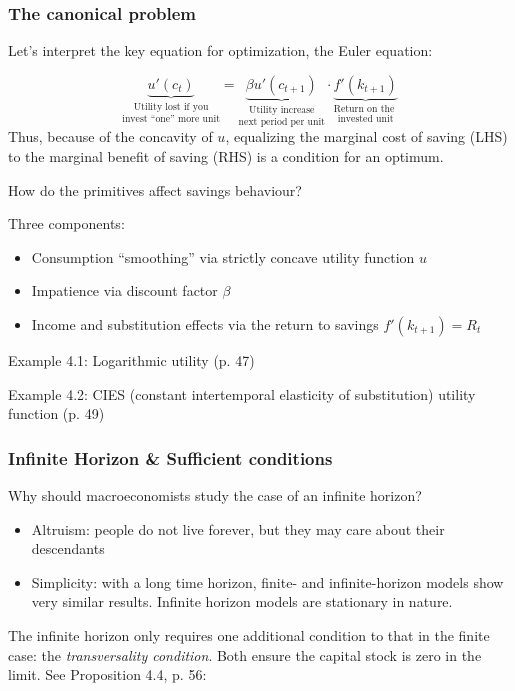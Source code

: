 \documentclass[10pt, handout]{beamer}
\begin{document}
\begin{frame}
\frametitle{ The canonical problem}

Let's interpret the key equation for optimization, the Euler equation:

\begin{equation}
\underset{\text{invest ``one'' more unit}}{\underset{\text{Utility lost if you}}{\underbrace{u'(c_t)}}} 
= 
\underset{\text{next period per unit}}{\underset{\text{Utility increase}}{\underbrace{\beta{u}'(c_{t+1})}}}  \cdot  \underset{\text{invested unit}}{\underset{\text{Return on the }}{\underbrace{f'(k_{t+1})}}}
\end{equation}
Thus, because of the concavity of $u$, equalizing the marginal cost of saving (LHS) to the marginal benefit of saving (RHS) is a condition for an optimum. \vskip0.25in


How do the primitives affect savings behaviour? 

Three components:
\begin{itemize}
\item[(i)] Consumption ``smoothing'' via strictly concave utility function $u$
\item[(ii)] Impatience via discount factor $\beta$
\item[(iii)] Income and substitution effects via the return to savings $f'(k_{t+1}) = R_t$
\end{itemize}

\end{frame}


\begin{frame}
Example 4.1: Logarithmic utility (p. 47)
\end{frame}


\begin{frame}
Example 4.2: CIES (constant intertemporal elasticity of substitution) utility function (p. 49)
\end{frame}




\begin{frame}
\frametitle{Infinite Horizon \& Sufficient conditions}
Why should macroeconomists study the case of an infinite horizon?
\begin{itemize}
\item Altruism: people do not live forever, but they may care about their descendants
\item Simplicity: with a long time horizon, finite- and infinite-horizon models show very similar results. Infinite horizon models are stationary in nature.
\end{itemize}\vskip0.2in


The infinite horizon only requires one additional condition to that in the finite case: the \textit{transversality condition}. Both ensure the capital stock is zero in the limit. See Proposition 4.4, p. 56:



\end{frame}
\end{document}
